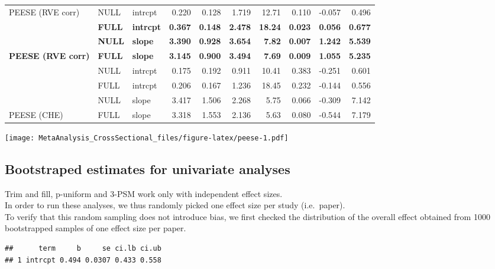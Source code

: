 \documentclass[
]{book}
\begin{document}
\begin{tabular}{l|l|l|r|r|r|r|r|r|r}
\cline{1-10}
PEESE (RVE corr) & NULL & intrcpt & 0.220 & 0.128 & 1.719 & 12.71 & 0.110 & -0.057 & 0.496\\
\cline{1-10}
 & \textbf{FULL} & \textbf{intrcpt} & \textbf{0.367} & \textbf{0.148} & \textbf{2.478} & \textbf{18.24} & \textbf{0.023} & \textbf{0.056} & \textbf{0.677}\\
\cline{2-10}
 & \textbf{NULL} & \textbf{slope} & \textbf{3.390} & \textbf{0.928} & \textbf{3.654} & \textbf{7.82} & \textbf{0.007} & \textbf{1.242} & \textbf{5.539}\\
\cline{2-10}
\multirow[t]{-3}{*}{\raggedright\arraybackslash \textbf{PEESE (RVE corr)}} & \textbf{FULL} & \textbf{slope} & \textbf{3.145} & \textbf{0.900} & \textbf{3.494} & \textbf{7.69} & \textbf{0.009} & \textbf{1.055} & \textbf{5.235}\\
\cline{1-10}
 & NULL & intrcpt & 0.175 & 0.192 & 0.911 & 10.41 & 0.383 & -0.251 & 0.601\\
\cline{2-10}
 & FULL & intrcpt & 0.206 & 0.167 & 1.236 & 18.45 & 0.232 & -0.144 & 0.556\\
\cline{2-10}
 & NULL & slope & 3.417 & 1.506 & 2.268 & 5.75 & 0.066 & -0.309 & 7.142\\
\cline{2-10}
\multirow[t]{-4}{*}{\raggedright\arraybackslash PEESE (CHE)} & FULL & slope & 3.318 & 1.553 & 2.136 & 5.63 & 0.080 & -0.544 & 7.179\\
\hline
\end{tabular}

\texttt{[image: MetaAnalysis\_CrossSectional\_files/figure-latex/peese-1.pdf]}

\hypertarget{bootstraped-estimates-for-univariate-analyses}{%
\subsection{Bootstraped estimates for univariate analyses}\label{bootstraped-estimates-for-univariate-analyses}}

Trim and fill, p-uniform and 3-PSM work only with independent effect sizes.\\
In order to run these analyses, we thus randomly picked one effect size per study (i.e.~paper).\\
To verify that this random sampling does not introduce bias, we first checked the distribution of
the overall effect obtained from 1000 bootstrapped samples of one effect size per paper.

\begin{verbatim}
##      term     b     se ci.lb ci.ub
## 1 intrcpt 0.494 0.0307 0.433 0.558
\end{verbatim}
\end{document}
